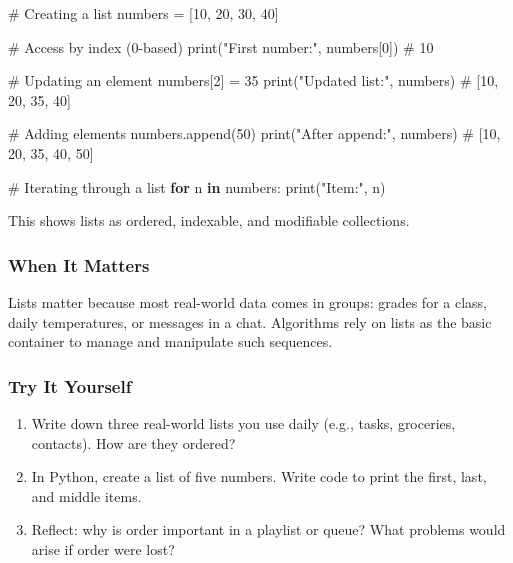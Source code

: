 \documentclass[
  letterpaper,
  DIV=11,
  numbers=noendperiod]{scrreprt}
\newenvironment{Shaded}{\begin{snugshade}}{\end{snugshade}}
\newcommand{\BuiltInTok}[1]{\textcolor[rgb]{0.00,0.23,0.31}{#1}}
\newcommand{\CommentTok}[1]{\textcolor[rgb]{0.37,0.37,0.37}{#1}}
\newcommand{\ControlFlowTok}[1]{\textcolor[rgb]{0.00,0.23,0.31}{\textbf{#1}}}
\newcommand{\DecValTok}[1]{\textcolor[rgb]{0.68,0.00,0.00}{#1}}
\newcommand{\KeywordTok}[1]{\textcolor[rgb]{0.00,0.23,0.31}{\textbf{#1}}}
\newcommand{\NormalTok}[1]{\textcolor[rgb]{0.00,0.23,0.31}{#1}}
\newcommand{\OperatorTok}[1]{\textcolor[rgb]{0.37,0.37,0.37}{#1}}
\newcommand{\StringTok}[1]{\textcolor[rgb]{0.13,0.47,0.30}{#1}}
\providecommand{\tightlist}{%
  \setlength{\itemsep}{0pt}\setlength{\parskip}{0pt}}
\begin{document}
\begin{Shaded}
\begin{Highlighting}[]
\CommentTok{\# Creating a list}
\NormalTok{numbers }\OperatorTok{=}\NormalTok{ [}\DecValTok{10}\NormalTok{, }\DecValTok{20}\NormalTok{, }\DecValTok{30}\NormalTok{, }\DecValTok{40}\NormalTok{]}

\CommentTok{\# Access by index (0{-}based)}
\BuiltInTok{print}\NormalTok{(}\StringTok{"First number:"}\NormalTok{, numbers[}\DecValTok{0}\NormalTok{])  }\CommentTok{\# 10}

\CommentTok{\# Updating an element}
\NormalTok{numbers[}\DecValTok{2}\NormalTok{] }\OperatorTok{=} \DecValTok{35}
\BuiltInTok{print}\NormalTok{(}\StringTok{"Updated list:"}\NormalTok{, numbers)     }\CommentTok{\# [10, 20, 35, 40]}

\CommentTok{\# Adding elements}
\NormalTok{numbers.append(}\DecValTok{50}\NormalTok{)}
\BuiltInTok{print}\NormalTok{(}\StringTok{"After append:"}\NormalTok{, numbers)     }\CommentTok{\# [10, 20, 35, 40, 50]}

\CommentTok{\# Iterating through a list}
\ControlFlowTok{for}\NormalTok{ n }\KeywordTok{in}\NormalTok{ numbers:}
    \BuiltInTok{print}\NormalTok{(}\StringTok{"Item:"}\NormalTok{, n)}
\end{Highlighting}
\end{Shaded}

This shows lists as ordered, indexable, and modifiable collections.

\subsubsection{When It Matters}\label{when-it-matters-50}

Lists matter because most real-world data comes in groups: grades for a
class, daily temperatures, or messages in a chat. Algorithms rely on
lists as the basic container to manage and manipulate such sequences.

\subsubsection{Try It Yourself}\label{try-it-yourself-52}

\begin{enumerate}
\def\labelenumi{\arabic{enumi}.}
\tightlist
\item
  Write down three real-world lists you use daily (e.g., tasks,
  groceries, contacts). How are they ordered?
\item
  In Python, create a list of five numbers. Write code to print the
  first, last, and middle items.
\item
  Reflect: why is order important in a playlist or queue? What problems
  would arise if order were lost?
\end{enumerate}
\end{document}
